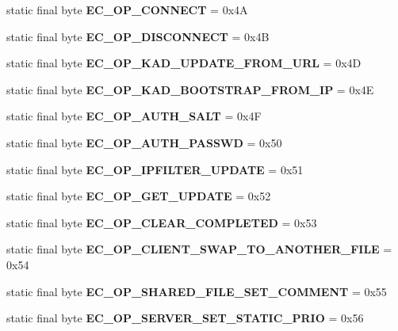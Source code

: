 \begin{DoxyCompactItemize}
\item 
static final byte {\bfseries EC\_\-OP\_\-CONNECT} = 0x4A\label{interfaceECCodes_a139d3eb58d544cec0c2b418120cb0939}

\item 
static final byte {\bfseries EC\_\-OP\_\-DISCONNECT} = 0x4B\label{interfaceECCodes_ae1f09309dad9af5b8e192c9c9af30447}

\item 
static final byte {\bfseries EC\_\-OP\_\-KAD\_\-UPDATE\_\-FROM\_\-URL} = 0x4D\label{interfaceECCodes_addaebf5c8de811b8792d1840cda0fee5}

\item 
static final byte {\bfseries EC\_\-OP\_\-KAD\_\-BOOTSTRAP\_\-FROM\_\-IP} = 0x4E\label{interfaceECCodes_ae82f48b677e201d972c44f4014cd659b}

\item 
static final byte {\bfseries EC\_\-OP\_\-AUTH\_\-SALT} = 0x4F\label{interfaceECCodes_a87cadd3783948c0cc8825b6cd740f7dc}

\item 
static final byte {\bfseries EC\_\-OP\_\-AUTH\_\-PASSWD} = 0x50\label{interfaceECCodes_a0a28cc835ba721417d384b30c7f90e81}

\item 
static final byte {\bfseries EC\_\-OP\_\-IPFILTER\_\-UPDATE} = 0x51\label{interfaceECCodes_aeda28c095dcc1039e7f6254f79a8c1d2}

\item 
static final byte {\bfseries EC\_\-OP\_\-GET\_\-UPDATE} = 0x52\label{interfaceECCodes_a714779ed7479e098dbe422afb655d23a}

\item 
static final byte {\bfseries EC\_\-OP\_\-CLEAR\_\-COMPLETED} = 0x53\label{interfaceECCodes_a9ef7cb7681ad3b04a2f7ef0bc6e0ec0b}

\item 
static final byte {\bfseries EC\_\-OP\_\-CLIENT\_\-SWAP\_\-TO\_\-ANOTHER\_\-FILE} = 0x54\label{interfaceECCodes_ad7b0b9cf3a8870eaec01d3b3df52c7df}

\item 
static final byte {\bfseries EC\_\-OP\_\-SHARED\_\-FILE\_\-SET\_\-COMMENT} = 0x55\label{interfaceECCodes_ab96dc73357ff940cb82db8a0c9625947}

\item 
static final byte {\bfseries EC\_\-OP\_\-SERVER\_\-SET\_\-STATIC\_\-PRIO} = 0x56\label{interfaceECCodes_a91e289c81e952eedc425bec6bed08635}


\end{DoxyCompactItemize}
